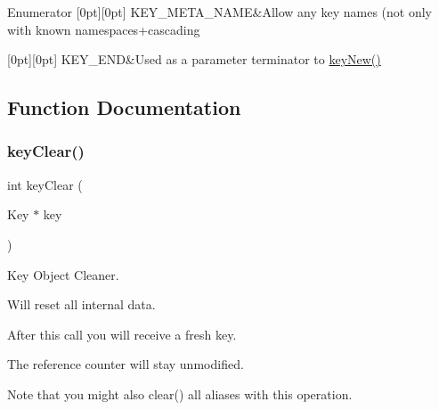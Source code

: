\begin{DoxyEnumFields}{Enumerator}
[0pt][0pt]{}\mbox{\label{group__key_gga91fb3178848bd682000958089abbaf40a5205cbd2831bc881da3589a95c08e054}} 
K\+E\+Y\+\_\+\+M\+E\+T\+A\+\_\+\+N\+A\+ME&Allow any key names (not only with known namespaces+cascading \\
\hline

[0pt][0pt]{}\mbox{\label{group__key_gga91fb3178848bd682000958089abbaf40aa8adb6fcb92dec58fb19410eacfdd403}} 
K\+E\+Y\+\_\+\+E\+ND&Used as a parameter terminator to \hyperlink{group__key_gad23c65b44bf48d773759e1f9a4d43b89}{key\+New()} \\
\hline

\end{DoxyEnumFields}


\subsection{Function Documentation}
\mbox{\label{group__key_gab2242311a36bbc0520e0d36895107ec1}} 
\subsubsection{\texorpdfstring{key\+Clear()}{keyClear()}}
{\footnotesize\ttfamily int key\+Clear (\begin{DoxyParamCaption}\item[{Key $\ast$}]{key }\end{DoxyParamCaption})}



Key Object Cleaner. 

Will reset all internal data.

After this call you will receive a fresh key.

The reference counter will stay unmodified.

\begin{DoxyNote}{Note}
that you might also clear() all aliases with this operation.
\end{DoxyNote}

